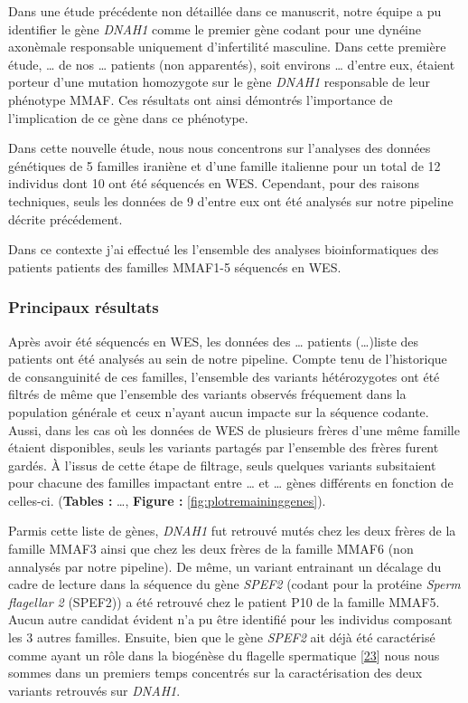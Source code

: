 \documentclass[12pt,twoside]{reedthesis}
\theoremstyle{definition}
\theoremstyle{definition}
\theoremstyle{remark}
\begin{document}
  Dans une étude précédente non détaillée dans ce manuscrit, notre équipe
  a pu identifier le gène \emph{DNAH1} comme le premier gène codant pour
  une dynéine axonèmale responsable uniquement d'infertilité masculine.
  Dans cette première étude, \ldots{} de nos \ldots{} patients (non
  apparentés), soit environs \ldots{} d'entre eux, étaient porteur d'une
  mutation homozygote sur le gène \emph{DNAH1} responsable de leur
  phénotype MMAF. Ces résultats ont ainsi démontrés l'importance de
  l'implication de ce gène dans ce phénotype.
  
  Dans cette nouvelle étude, nous nous concentrons sur l'analyses des
  données génétiques de 5 familles iraniène et d'une famille italienne
  pour un total de 12 individus dont 10 ont été séquencés en WES.
  Cependant, pour des raisons techniques, seuls les données de 9 d'entre
  eux ont été analysés sur notre pipeline décrite précédement.
  
  Dans ce contexte j'ai effectué les l'ensemble des analyses
  bioinformatiques des patients patients des familles MMAF1-5 séquencés en
  WES.
  
  \newpage
  
  
  
  \newpage
  
  \subsubsection{Principaux résultats}\label{principaux-resultats-2}
  
  Après avoir été séquencés en WES, les données des \ldots{} patients
  (\ldots{})liste des patients ont été analysés au sein de notre pipeline.
  Compte tenu de l'historique de consanguinité de ces familles, l'ensemble
  des variants hétérozygotes ont été filtrés de même que l'ensemble des
  variants observés fréquement dans la population générale et ceux n'ayant
  aucun impacte sur la séquence codante. Aussi, dans les cas où les
  données de WES de plusieurs frères d'une même famille étaient
  disponibles, seuls les variants partagés par l'ensemble des frères
  furent gardés. À l'issus de cette étape de filtrage, seuls quelques
  variants subsitaient pour chacune des familles impactant entre \ldots{}
  et \ldots{} gènes différents en fonction de celles-ci. (\textbf{Tables
  :} \ldots{}, \textbf{Figure : }\ref{fig:plotremaininggenes}).
  
  Parmis cette liste de gènes, \emph{DNAH1} fut retrouvé mutés chez les
  deux frères de la famille MMAF3 ainsi que chez les deux frères de la
  famille MMAF6 (non annalysés par notre pipeline). De même, un variant
  entrainant un décalage du cadre de lecture dans la séquence du gène
  \emph{SPEF2} (codant pour la protéine \emph{Sperm flagellar 2} (SPEF2))
  a été retrouvé chez le patient P10 de la famille MMAF5. Aucun autre
  candidat évident n'a pu être identifié pour les individus composant les
  3 autres familles. Ensuite, bien que le gène \emph{SPEF2} ait déjà été
  caractérisé comme ayant un rôle dans la biogénèse du flagelle
  spermatique {[}\protect\hyperlink{ref-Lehti2017}{23}{]} nous nous sommes
  dans un premiers temps concentrés sur la caractérisation des deux
  variants retrouvés sur \emph{DNAH1}.
  
\end{document}
